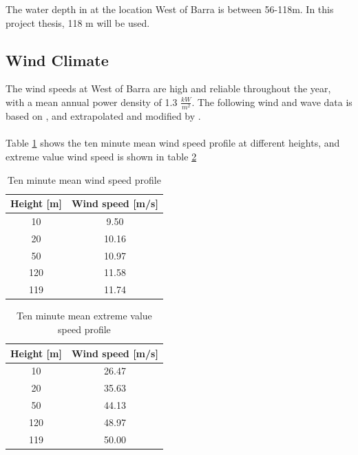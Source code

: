 \noindent The water depth in at the location West of Barra is between 56-118m. In this project thesis, 118 m will be used. 

\subsection{Wind Climate}

The wind speeds at West of Barra are high and reliable throughout the year, with a mean annual power density of 1.3 $\frac{kW}{m^2}$. The following wind and wave data is based on \cite{geos2001}, and extrapolated and modified by \cite{Lifes50+D1.1}. 
\\\\
Table \ref{table:wind} shows the ten minute mean wind speed profile at different heights, and extreme value wind speed is shown in table  \ref{table:windex}
\begin{table} [H]
\centering
\begin{tabular}{ |c|c|}
\hline
 Height [m]& Wind speed [m/s]\\
 \hline
 \hline
 10 & 9.50 \\

 20 & 10.16 \\
 
 50 & 10.97 \\
 
 120 & 11.58 \\

 119 & 11.74  \\
 \hline
\end{tabular}
\caption{Ten minute mean wind speed profile}
\label{table:wind}
\end{table}

\begin{table} [H]
\centering
\begin{tabular}{ |c|c|}
\hline
 Height [m]& Wind speed [m/s]\\
 \hline
 \hline
 10 & 26.47 \\

 20 & 35.63 \\
 
 50 & 44.13 \\
 
 120 & 48.97 \\

 119 & 50.00  \\
 \hline
\end{tabular}
\caption{Ten minute mean extreme value speed profile}
\label{table:windex}
\end{table}

